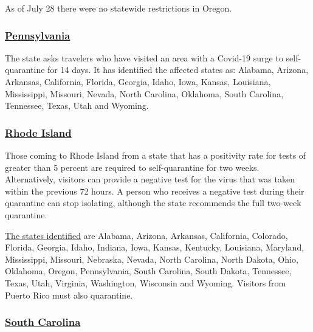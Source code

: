 As of July 28 there were no statewide restrictions in Oregon.

\hypertarget{pennsylvania}{%
\subsubsection{\texorpdfstring{\href{https://www.health.pa.gov/topics/disease/coronavirus/Pages/Travelers.aspx}{Pennsylvania}}{Pennsylvania}}\label{pennsylvania}}

The state asks travelers who have visited an area with a Covid-19 surge
to self-quarantine for 14 days. It has identified the affected states
as: Alabama, Arizona, Arkansas, California, Florida, Georgia, Idaho,
Iowa, Kansas, Louisiana, Mississippi, Missouri, Nevada, North Carolina,
Oklahoma, South Carolina, Tennessee, Texas, Utah and Wyoming.

\hypertarget{rhode-island}{%
\subsubsection{\texorpdfstring{\href{https://health.ri.gov/covid/}{Rhode
Island}}{Rhode Island}}\label{rhode-island}}

Those coming to Rhode Island from a state that has a positivity rate for
tests of greater than 5 percent are required to self-quarantine for two
weeks. Alternatively, visitors can provide a negative test for the virus
that was taken within the previous 72 hours. A person who receives a
negative test during their quarantine can stop isolating, although the
state recommends the full two-week quarantine.

\href{https://docs.google.com/spreadsheets/d/e/2PACX-1vSUCk9FlHBoJt5ZO0U6PKTTY7jHH8V4MovED0WiqpTTixdgMSCnUWI25xX5DCmQmtLknzu7Bo0jwY02/pubhtml?gid=0\&single=true}{The
states identified} are Alabama, Arizona, Arkansas, California, Colorado,
Florida, Georgia, Idaho, Indiana, Iowa, Kansas, Kentucky, Louisiana,
Maryland, Mississippi, Missouri, Nebraska, Nevada, North Carolina, North
Dakota, Ohio, Oklahoma, Oregon, Pennsylvania, South Carolina, South
Dakota, Tennessee, Texas, Utah, Virginia, Washington, Wisconsin and
Wyoming. Visitors from Puerto Rico must also quarantine.

\hypertarget{south-carolina}{%
\subsubsection{\texorpdfstring{\href{https://scdhec.gov/infectious-diseases/viruses/coronavirus-disease-2019-covid-19/travelers-covid-19}{South
Carolina}}{South Carolina}}\label{south-carolina}}

